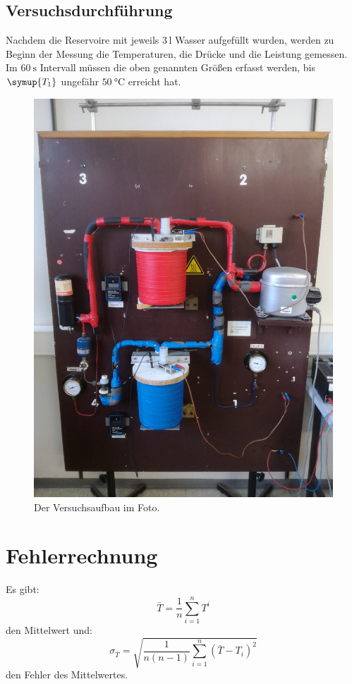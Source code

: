 \subsection{Versuchsdurchführung}
Nachdem die Reservoire mit jeweils 3\,$\si{\litre}$ Wasser aufgefüllt wurden,
werden zu Beginn der Messung  die Temperaturen, die Drücke und die Leistung gemessen.
Im $\SI{60}{\second}$ Intervall müssen die oben genannten Größen erfasst werden, bis
$\symup{T_1}$ ungefähr $\SI{50}{\celsius}$ erreicht hat.
\begin{figure}
  \centering
  \includegraphics[scale=0.07]{foto.jpg}
  \caption{Der Versuchsaufbau im Foto.}
  \label{fig:2}
\end{figure}
\section{Fehlerrechnung}
Es gibt:
\begin{equation}
  \bar{T} = \frac{1}{n} \sum_{i=1}^{n} T^{i}
  \label{eqn:1}
\end{equation}
den Mittelwert und:
\begin{equation}
  \sigma_{\bar{T}} = \sqrt{\frac{1}{n(n-1)} \sum_{i=1}^{n}(\bar{T}-T_i)^2}
  \label{eqn:2}
\end{equation}
den Fehler des Mittelwertes.
